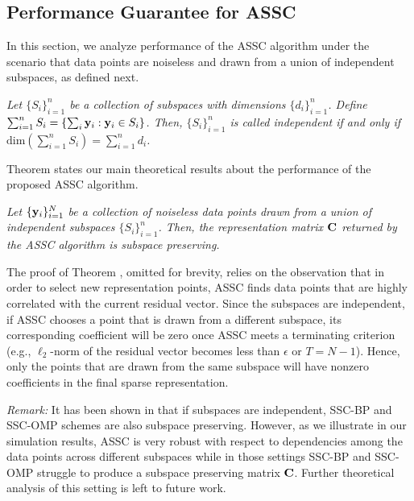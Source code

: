 \subsection{Performance Guarantee for ASSC}
In this section, we analyze performance of the ASSC algorithm under the scenario that data points are noiseless and drawn from a union of independent subspaces, as defined next.
\begin{definition}
\textit{Let $\{S_i\}_{i=1}^{n}$ be a collection of subspaces with dimensions $\{d_i\}_{i=1}^{n}$. Define $\sum_{i=1}^n{S_i} = \{\sum_{i}{\mathbf y}_{i}: {\mathbf y}_{i} \in S_i\}$. Then, $\{S_i\}_{i=1}^{n}$ is called independent if and only if $\mathrm{dim}(\sum_{i=1}^n{S_i}) = \sum_{i=1}^n{d_i}$.}
\end{definition}
Theorem  states our main theoretical results about the performance of the 
proposed ASSC algorithm.
\begin{theorem}\label{thm:indep}
\textit{Let $\{{\mathbf y}_i\}_{i=1}^N$ be a collection of noiseless data points drawn  from a union of independent subspaces $\{S_i\}_{i=1}^{n}$. Then, the representation matrix ${\mathbf C}$ returned by the 
ASSC algorithm is subspace preserving.}
\end{theorem}

The proof of Theorem , omitted for brevity, relies on the observation that in order to select new representation points, ASSC finds data points that are highly correlated with the current residual vector. Since the subspaces are independent, if ASSC chooses a point that is drawn from a different subspace, its corresponding coefficient will be zero once ASSC meets a terminating criterion (e.g., $\ell_2$-norm of the residual vector becomes less than $\epsilon$ or $T= N-1$). Hence, only the points that are drawn from the same subspace will have nonzero coefficients in the final sparse representation. 

\textit{Remark:} It has been shown in \cite{elhamifar2009sparse,dyer2013greedy,you2015sparse} that if subspaces are independent, SSC-BP and SSC-OMP schemes are also subspace preserving. However, as we illustrate in our simulation results, ASSC is very robust with respect to dependencies among the data points across different subspaces while in those settings SSC-BP and SSC-OMP struggle to produce a subspace preserving matrix ${\mathbf C}$. Further theoretical analysis of this setting is left to future work. 
